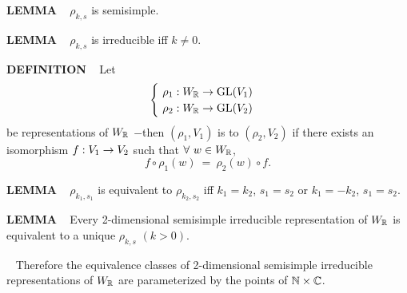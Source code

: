 \vspace{0.1cm}

\begin{x}{\small\bf LEMMA} \ %
$\rho_{k,s}$ is semisimple.
\end{x}

\vspace{0.1cm}

\begin{x}{\small\bf LEMMA} \ %
$\rho_{k,s}$ is irreducible iff $k \neq 0$.
\end{x}

\vspace{0.1cm}

\begin{x}{\small\bf DEFINITION} \ %
Let
\[
\begin{cases}
 \ \rho_1:W_{\mathbb{R}} \rightarrow \text{GL}(V_1)\\
 \ \rho_2:W_{\mathbb{R}} \rightarrow \text{GL}(V_2)\\
\end{cases}
\]
be representations of $W_{\mathbb{R}}$ $-$then $(\rho_1,V_1)$ is 
to $(\rho_2,V_2)$ if there exists an 
isomorphism $f:V_1 \rightarrow V_2$ such that $\forall \ w \in W_{\mathbb{R}}$, 
\[
f \circ \rho_1(w) \ = \ \rho_2(w) \circ f.
\]
\end{x}

\vspace{0.1cm}

\begin{x}{\small\bf LEMMA} \ %
$\rho_{k_1,s_1}$ is equivalent to $\rho_{k_2,s_2}$ iff $k_1 = k_2$, $s_1 = s_2$ or $k_1 = -k_2$, $s_1 = s_2$.
\end{x}

\vspace{0.1cm}

\begin{x}{\small\bf LEMMA} \ %
Every 2-dimensional semisimple irreducible representation of $W_{\mathbb{R}}$ is equivalent to a unique $\rho_{k,s}$ $(k > 0)$.
\end{x}

\vspace{0.1cm}

\begin{x}{\small\bf {}} \ %
Therefore the equivalence classes of 2-dimensional semisimple irreducible representations of $W_{\mathbb{R}}$ are parameterized by 
the points of $\mathbb{N} \times \mathbb{C}$.
\end{x}

\vspace{0.1cm}

